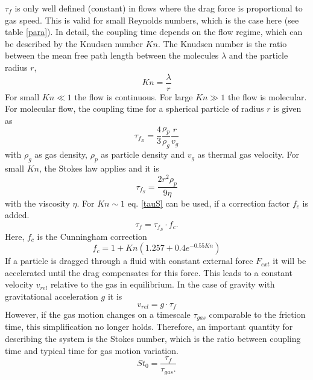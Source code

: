 $\tau_f$ is only well defined (constant) in flows where the drag force is proportional to gas speed. This is valid for small Reynolds numbers, which is the case here {(see table \ref{para})}. In detail, the coupling time depends on the flow regime, which can be described by the Knudsen number $Kn$.
The Knudsen number is the ratio between the mean free path length between the molecules $\lambda$ and the particle radius $r$,
\begin{equation}
Kn = \frac{\lambda}{r}
\label{tau_no}
\end{equation}
For small $Kn\ll1$ the flow is continuous. For large $Kn\gg1$ the flow is molecular.
For molecular flow, the coupling time for a spherical particle of radius $r$ is given as
\begin{equation}
\tau_{f_E} = \frac{4}{3} \frac{\rho_p}{\rho_g} \frac{r}{v_g}
\label{tau0}
\end{equation}
with $\rho_g$ as gas density, $\rho_p$ as particle density and $v_g$ as thermal gas velocity. 
For small $Kn$, the Stokes law applies and it is
\begin{equation}
\tau_{f_S} = \frac{2 r^2 \rho_p}{9 \eta} 
\label{tauS}
\end{equation}
with the viscosity $\eta$.
For $Kn \sim 1$ eq. \ref{tauS} can be used, if a correction factor $f_c$ is added.
\begin{equation}
\tau_f = \tau_{f_S} \cdot f_c.
\label{tau}
\end{equation}
Here, $f_c$ is the Cunningham correction \citep{cunningham1910,hutchins1995}
\begin{equation}
f_c = 1+Kn(1.257+0.4e^{-0.55 Kn})
\end{equation}
If a particle is dragged through a fluid with constant external force $F_{ext}$ it will be accelerated until the drag compensates for this force.
This leads to a constant velocity $v_{rel}$ relative to the gas in equilibrium. In the case of gravity with gravitational acceleration $g$ it is
\begin{equation}
v_{rel} = g \cdot \tau_f
\label{vrel}
\end{equation}
However, if the gas motion changes on a timescale $\tau_{gas}$ comparable to the friction time, this simplification no longer holds. Therefore, an important quantity for describing the system is the Stokes number, which is the ratio between coupling time and typical time for gas motion variation.
\begin{equation}
St_0 = \frac{\tau_f}{\tau_{gas}.}
\end{equation}
